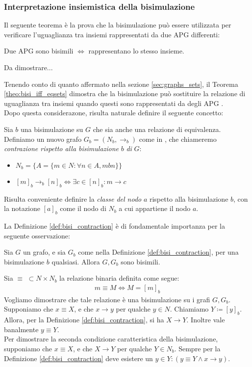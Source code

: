\subsubsection{Interpretazione insiemistica della bisimulazione}
Il seguente teorema è la prova che la bisimulazione può essere utilizzata per verificare l'uguaglianza tra insiemi rappresentati da due APG differenti:
\begin{theorem}
    Due APG sono bisimili $\iff$ rappresentano lo stesso insieme.
    \label{theo:bisi_iff_eqsets}
\end{theorem}
\begin{proof2}
    Da dimostrare...
\end{proof2}
Tenendo conto di quanto affermato nella sezione \ref*{sec:graphs_sets}, il Teorema \ref*{theo:bisi_iff_eqsets} dimostra che la bisimulazione può sostituire la
relazione di uguaglianza tra insiemi quando questi sono rappresentati da degli APG \cite{dovier}.\\
Dopo questa considerazone, risulta naturale definire il seguente concetto:
\begin{definition}
    Sia $b$ una bisimulazione su $G$ che sia anche una relazione di equivalenza. Definiamo un nuovo grafo $G_b = (N_b, \to_b)$ come in \cite{gentilini}, che chiameremo \textit{contrazione rispetto alla bisimulazione} $b$ \textit{di} $G$:
    \begin{itemize}
        \item $N_b = \{A = \{m \in N : \forall n \in A, m b n\}\}$
        \item $[m]_b \to_b [n]_b \iff \exists c \in [n]_b : m \to c$
    \end{itemize}
    Risulta conveniente definire la \textit{classe del nodo} $a$ rispetto alla bisimulazione $b$, con la notazione $[a]_b$ come il nodo di $N_b$ a cui appartiene il nodo $a$.
    \label{def:bisi_contraction}
\end{definition}
La Definizione \ref*{def:bisi_contraction} è di fondamentale importanza per la seguente osservazione:
\begin{proposition}
    Sia $G$ un grafo, e sia $G_b$ come nella Definizione \ref*{def:bisi_contraction}, per una bisimulazione $b$ qualsiasi. Allora $G, G_b$ sono bisimili.
    \label{prop:bisi_cont_bisi}
\end{proposition}
\begin{proof2}
    Sia $\equiv \,\,\subset N \times N_b$ la relazione binaria definita come segue:
    \begin{gather*}
        m \equiv M \iff M = [m]_b
    \end{gather*}
    Vogliamo dimostrare che tale relazione è una bisimulazione su i grafi $G, G_b$.\\
    Supponiamo che $x \equiv X$, e che $x \to y$ per qualche $y \in N$. Chiamiamo $Y \coloneqq [y]_b$. Allora, per la Definizione \ref*{def:bisi_contraction}, si ha $X \to Y$. Inoltre vale banalmente $y \equiv Y$.\\
    Per dimostrare la seconda condizione caratteristica della bisimulazione, supponiamo che $x \equiv X$, e che $X \to Y$ per qualche $Y \in N_b$. Sempre per la Definizione \ref*{def:bisi_contraction} deve esistere un $y \in Y : (y \equiv Y \land x \to y)$.
\end{proof2}
